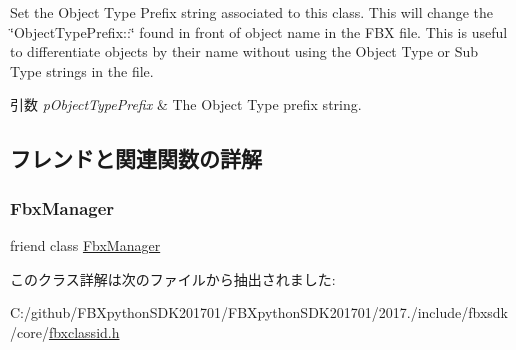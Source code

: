 Set the Object Type Prefix string associated to this class. This will change the \char`\"{}\+Object\+Type\+Prefix\+::\char`\"{} found in front of object name in the F\+BX file. This is useful to differentiate objects by their name without using the Object Type or Sub Type strings in the file. 
\begin{DoxyParams}{引数}
{\em p\+Object\+Type\+Prefix} & The Object Type prefix string. \\
\hline
\end{DoxyParams}


\subsection{フレンドと関連関数の詳解}
\mbox{\label{class_fbx_class_id_aa6292f0d09535e3fe957088d09276268}} 
\subsubsection{\texorpdfstring{Fbx\+Manager}{FbxManager}}
{\footnotesize\ttfamily friend class \hyperlink{class_fbx_manager}{Fbx\+Manager}\hspace{0.3cm}{\ttfamily [friend]}}



このクラス詳解は次のファイルから抽出されました\+:\begin{DoxyCompactItemize}
\item 
C\+:/github/\+F\+B\+Xpython\+S\+D\+K201701/\+F\+B\+Xpython\+S\+D\+K201701/2017./include/fbxsdk/core/\hyperlink{fbxclassid_8h}{fbxclassid.\+h}\end{DoxyCompactItemize}
